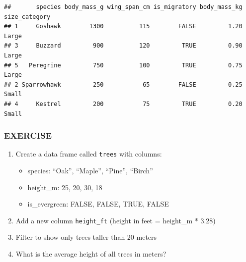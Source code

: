 \documentclass[
]{article}
\newenvironment{Shaded}{\begin{snugshade}}{\end{snugshade}}
\newcommand{\AttributeTok}[1]{\textcolor[rgb]{0.13,0.29,0.53}{#1}}
\newcommand{\CommentTok}[1]{\textcolor[rgb]{0.56,0.35,0.01}{\textit{#1}}}
\newcommand{\ConstantTok}[1]{\textcolor[rgb]{0.56,0.35,0.01}{#1}}
\newcommand{\DecValTok}[1]{\textcolor[rgb]{0.00,0.00,0.81}{#1}}
\newcommand{\FloatTok}[1]{\textcolor[rgb]{0.00,0.00,0.81}{#1}}
\newcommand{\FunctionTok}[1]{\textcolor[rgb]{0.13,0.29,0.53}{\textbf{#1}}}
\newcommand{\NormalTok}[1]{#1}
\newcommand{\OtherTok}[1]{\textcolor[rgb]{0.56,0.35,0.01}{#1}}
\newcommand{\SpecialCharTok}[1]{\textcolor[rgb]{0.81,0.36,0.00}{\textbf{#1}}}
\newcommand{\StringTok}[1]{\textcolor[rgb]{0.31,0.60,0.02}{#1}}
\providecommand{\tightlist}{%
  \setlength{\itemsep}{0pt}\setlength{\parskip}{0pt}}
\begin{document}
\begin{verbatim}
##       species body_mass_g wing_span_cm is_migratory body_mass_kg size_category
## 1     Goshawk        1300          115        FALSE         1.20         Large
## 3     Buzzard         900          120         TRUE         0.90         Large
## 5   Peregrine         750          100         TRUE         0.75         Large
## 2 Sparrowhawk         250           65        FALSE         0.25         Small
## 4     Kestrel         200           75         TRUE         0.20         Small
\end{verbatim}

\subsubsection{EXERCISE}\label{exercise-4}

\begin{enumerate}
\def\labelenumi{\arabic{enumi}.}
\tightlist
\item
  Create a data frame called \texttt{trees} with columns:

  \begin{itemize}
  \tightlist
  \item
    species: ``Oak'', ``Maple'', ``Pine'', ``Birch''
  \item
    height\_m: 25, 20, 30, 18
  \item
    is\_evergreen: FALSE, FALSE, TRUE, FALSE
  \end{itemize}
\item
  Add a new column \texttt{height\_ft} (height in feet = height\_m *
  3.28)
\item
  Filter to show only trees taller than 20 meters
\item
  What is the average height of all trees in meters?
\end{enumerate}

\begin{Shaded}
\end{Shaded}
\end{document}
